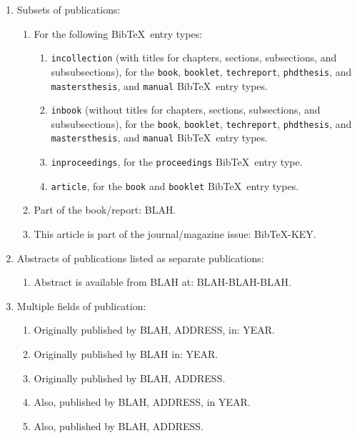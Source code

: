 \documentclass[letter,12pt]{article}
\begin{document}
\begin{enumerate}
\begin{enumerate}
\begin{enumerate}
		\end{enumerate}
	\item Subsets of publications: \vspace{-0.2cm}
		\begin{enumerate} \itemsep -2pt
		\item For the following {\sc Bib}\TeX\ entry types: \vspace{-0.1cm}
			\begin{enumerate} \itemsep -1pt
			\item {\tt incollection} (with titles for chapters, sections, subsections, and subsubsections), for the {\tt book}, {\tt booklet}, {\tt techreport}, {\tt phdthesis}, and {\tt mastersthesis}, and {\tt manual} {\sc Bib}\TeX\ entry types.
			\item {\tt inbook} (without titles for chapters, sections, subsections, and subsubsections), for the {\tt book}, {\tt booklet}, {\tt techreport}, {\tt phdthesis}, and {\tt mastersthesis}, and {\tt manual} {\sc Bib}\TeX\ entry types.
			\item {\tt inproceedings}, for the {\tt proceedings} {\sc Bib}\TeX\ entry type.
			\item {\tt article}, for the {\tt book} and {\tt booklet} {\sc Bib}\TeX\ entry types.
			\end{enumerate}
		\item Part of the book/report: BLAH.
		\item This article is part of the journal/magazine issue: BibTeX-KEY.
		\end{enumerate}
	\item Abstracts of publications listed as separate publications: \vspace{-0.2cm}
		\begin{enumerate} \itemsep -2pt
		\item Abstract is available from BLAH at: BLAH-BLAH-BLAH.
		\end{enumerate}
	\item Multiple fields of publication: \vspace{-0.2cm}
		\begin{enumerate} \itemsep -2pt
		\item Originally published by BLAH, ADDRESS, in: YEAR.
		\item Originally published by BLAH in: YEAR.
		\item Originally published by BLAH, ADDRESS.
		\item Also, published by BLAH, ADDRESS, in YEAR.
		\item Also, published by BLAH, ADDRESS.

\end{enumerate}
\end{enumerate}
\end{enumerate}
\end{document}
